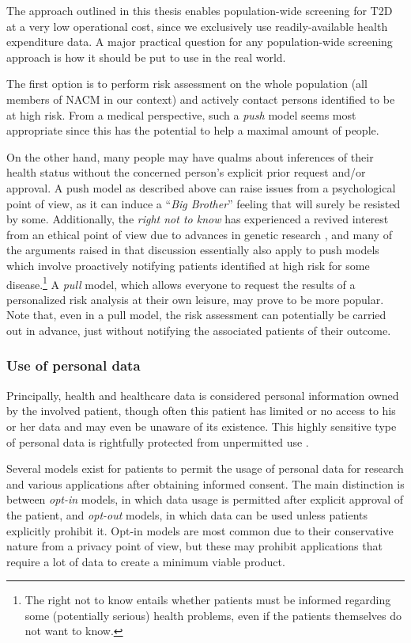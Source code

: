 The approach outlined in this thesis enables population-wide screening for T2D at a very low operational cost, since we exclusively use readily-available health expenditure data. A major practical question for any population-wide screening approach is how it should be put to use in the real world. 

The first option is to perform risk assessment on the whole population (all members of NACM in our context) and actively contact persons identified to be at high risk. From a medical perspective, such a \emph{push} model seems most appropriate since this has the potential to help a maximal amount of people. 

On the other hand, many people may have qualms about inferences of their health status without the concerned person's explicit prior request and/or approval. A push model as described above can raise issues from a psychological point of view, as it can induce a ``\emph{Big Brother}'' feeling that will surely be resisted by some. Additionally, the \emph{right not to know} has experienced a revived interest from an ethical point of view due to advances in genetic research \citep{ost1984right, andorno2004right, chadwick2014right}, and many of the arguments raised in that discussion essentially also apply to push models which involve proactively notifying patients identified at high risk for some disease.\footnote{The right not to know entails whether patients must be informed regarding some (potentially serious) health problems, even if the patients themselves do not want to know.} A \emph{pull} model, which allows everyone to request the results of a personalized risk analysis at their own leisure, may prove to be more popular. Note that, even in a pull model, the risk assessment can potentially be carried out in advance, just without notifying the associated patients of their outcome.

\subsubsection{Use of personal data}

Principally, health and healthcare data is considered personal information owned by the involved patient, though often this patient has limited or no access to his or her data and may even be unaware of its existence. This highly sensitive type of personal data is rightfully protected from unpermitted use \citep{privacywet,eu_data}.

Several models exist for patients to permit the usage of personal data for research and various applications after obtaining informed consent. The main distinction is between \emph{opt-in} models, in which data usage is permitted after explicit approval of the patient, and \emph{opt-out} models, in which data can be used unless patients explicitly prohibit it. Opt-in models are most common due to their conservative nature from a privacy point of view, but these may prohibit applications that require a lot of data to create a minimum viable product. 

